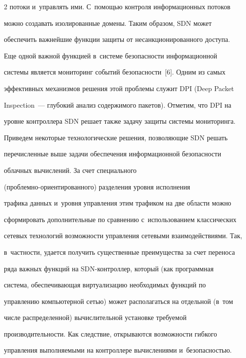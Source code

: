 \begin{multicols}{2}
потоки и~управлять ими. С~помощью контроля информационных потоков 


можно создавать изолированные домены. Таким образом, SDN может 


обеспечить важнейшие функции защиты от несанкционированного доступа.


  


  Еще одной важной функцией в~системе безопасности информационной 


системы является мониторинг событий безопасности~[6]. Одним из самых 


эффективных механизмов решения этой проблемы служит DPI (Deep Packet 


Inspection~--- глубокий анализ содержимого пакетов). Отметим, что DPI на 


уровне контроллера SDN решает также задачу защиты системы мониторинга.


  


  Приведем некоторые технологические решения, позволяющие SDN решать 


перечисленные выше задачи обеспечения информационной без\-опас\-ности 


облачных вычислений. За счет специ\-ального  


(проб\-лем\-но-ори\-ен\-ти\-ро\-ван\-но\-го) разделения уровня исполнения 


трафика данных и~уровня управления этим трафиком на две области можно 


сформировать дополнительные по сравнению с~использованием классических 


сетевых технологий возможности управления сетевыми взаимодействиями. Так, 


в~част\-ности, удается получить существенные преимущества за счет переноса 


ряда важных функций на SDN-конт\-рол\-лер, который (как программная 


система, обеспечивающая виртуализацию необхо\-димых функций по 


управлению компьютерной \mbox{сетью}) может располагаться на отдельной (в~том 


числе распределенной) вычислительной установке требуемой 


производительности. Как следствие, открываются возможности гибкого 


управления выполняемыми на контроллере вы\-чис\-ле\-ни\-ями и~без\-опас\-ностью.



\end{multicols}
